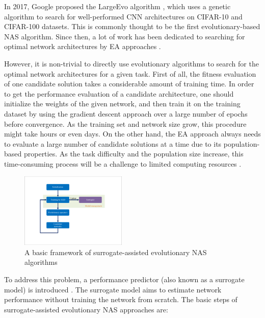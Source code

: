 \documentclass[journal]{IEEEtran}
\begin{document}
In 2017, Google proposed the LargeEvo algorithm \cite{real2017large}, which uses a genetic algorithm to search for well-performed CNN architectures on CIFAR-10 and CIFAR-100 datasets. This is commonly thought to be the first evolutionary-based NAS algorithm. Since then, a lot of work has been dedicated to searching for optimal network architectures by EA approaches \cite{real2019regularized, liu2017hierarchical, xie2017genetic, sun2019evolving, zhu2021toward, lu2020multi, elsken2018efficient}.

However, it is non-trivial to directly use evolutionary algorithms to search for the optimal network architectures for a given task. 
First of all, the fitness evaluation of one candidate solution takes a considerable amount of training time. In order to get the performance evaluation of a candidate architecture, one should initialize the weights of the given network, and then train it on the training dataset by using the gradient descent approach over a large number of epochs before convergence. As the training set and network size grow, this procedure might take hours or even days. On the other hand, the EA approach always needs to evaluate a large number of candidate solutions at a time due to its population-based properties. As the task difficulty and the population size increase, this time-consuming process will be a challenge to limited computing resources \cite{liu2021survey}.

\begin{figure}[H]
\centering %
\includegraphics[width=0.45\textwidth]{saea_nas.pdf} %
\caption{A basic framework of surrogate-assisted evolutionary NAS algorithms} %
\label{Fig_6}
\end{figure}

To address this problem, a performance predictor (also known as a surrogate model) is introduced \cite{jin2011surrogate}. The surrogate model aims to estimate network performance without training the network from scratch. The basic steps of surrogate-assisted evolutionary NAS approaches are:
\end{document}
